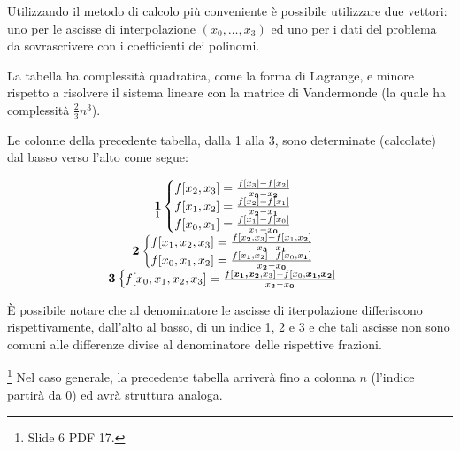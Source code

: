 Utilizzando il metodo di calcolo più conveniente è possibile utilizzare due vettori: uno per le ascisse di interpolazione $(x_0,\hdots, x_3)$ ed uno per i dati del problema da sovrascrivere con i coefficienti dei polinomi.

La tabella ha complessità quadratica, come la forma di Lagrange, e minore rispetto a risolvere il sistema lineare con la matrice di Vandermonde (la quale ha complessità $\frac{2}{3}n^3$).

Le colonne della precedente tabella, dalla 1 alla 3, sono determinate (calcolate) dal basso verso l'alto come segue:

\begin{equation*}
    \begin{matrix}
        \underset{\footnotemark}{\boldsymbol 1}
    \begin{cases}
        f[x_2,x_3]=\frac{f[x_3]-f[x_2]}{x_{\boldsymbol 3}-x_{\boldsymbol 2}}\\
        f[x_1,x_2]=\frac{f[x_2]-f[x_1]}{x_{\boldsymbol 2}-x_{\boldsymbol 1}}\\
        f[x_0,x_1]=\frac{f[x_1]-f[x_0]}{x_{\boldsymbol 1}-x_{\boldsymbol 0}}
    \end{cases}\\
    \boldsymbol{2}\begin{cases}
        f[x_1,x_2,x_3]=\frac{f[x_{\boldsymbol 2},x_3]-f[x_1,x_{\boldsymbol 2}]}{x_{\boldsymbol 3}-x_{\boldsymbol 1}}\\
        f[x_0,x_1,x_2]=\frac{f[x_{\boldsymbol 1},x_2]-f[x_0,x_{\boldsymbol 1}]}{x_{\boldsymbol 2}-x_{\boldsymbol 0}}
    \end{cases}\\
    \boldsymbol{3}\begin{cases}
        f[x_0,x_1,x_2,x_3]=\frac{f[\boldsymbol{x_1,x_2},x_3]-f[x_0,\boldsymbol{x_1,x_2}]}{x_{\boldsymbol 3}-x_{\boldsymbol 0}}
    \end{cases}
    \end{matrix}
\end{equation*}

È possibile notare che al denominatore le ascisse di iterpolazione differiscono rispettivamente, dall'alto al basso, di un indice 1, 2 e 3 e che tali ascisse non sono comuni alle differenze divise al denominatore delle rispettive frazioni.

\begin{remark}\footnote{Slide 6 PDF 17.}
    Nel caso generale, la precedente tabella arriverà fino a colonna $n$ (l'indice partirà da 0) ed avrà struttura analoga.
\end{remark}

